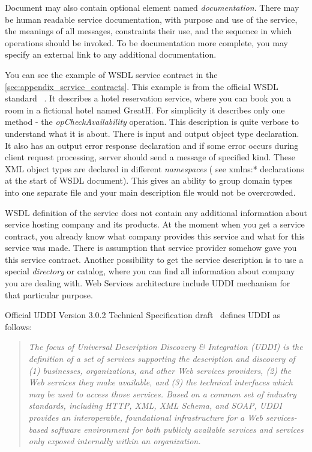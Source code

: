 

Document may also contain optional element named \textit{documentation}.
There may be human readable service documentation, with   purpose and use of the service, the meanings of all messages, constraints their use, and the sequence in which operations should be invoked.
To be documentation more complete, you may specify an external link to any additional documentation.


You can see the example of WSDL service contract in the 
\autoref{sec:appendix_service_contracts}. This example is from the official
WSDL standard ~\cite{wsdl_language_spec}. It describes a hotel reservation
service, where you can book you a room in a fictional hotel named GreatH. For simplicity it describes
only one method - the \textit{opCheckAvailability} operation. This description
is quite verbose to understand what it is about. There is input and output
object type declaration. It also has an output error response declaration and
if some error occurs during client request processing, server should send a
message of specified kind.
These XML object types are declared in different \textit{namespaces} ( see
xmlns:*	declarations at the start of WSDL document). This gives an ability
to group domain types into one separate file and your main description
file would not be overcrowded.


WSDL definition of the service does not contain any additional
information about service hosting company and its products. At the moment when
you get a service contract, you already know what company provides this service and what
for this service was made. There is assumption that service provider somehow
gave you this service contract. Another possibility to get the service
description is to use a special \textit{directory} or catalog, where you can
find all information about company you are dealing with. Web Services
architecture include UDDI mechanism for that particular purpose.

Official UDDI Version 3.0.2 Technical Specification draft~\cite{uddi_spec}
defines UDDI as follows:
\begin{quotation}
\textit{
 The focus of Universal Description Discovery & Integration (UDDI) is the
definition of a set of services supporting the description and discovery of (1) businesses,
organizations, and other Web services providers, 
(2) the Web services they make available,
 and (3) the technical interfaces which may be used to access those services.
 Based on a common set of industry standards, including HTTP, XML, XML Schema, and SOAP,
 UDDI provides an interoperable, foundational infrastructure for a Web services-based software environment
 for both publicly available services and services only exposed internally within an organization.
}
\end{quotation}

